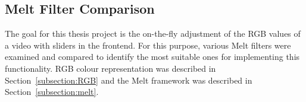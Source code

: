 \documentclass[../MasterThesis.tex]{subfiles}
\begin{document}
%
%
%
%
%
%
%
%
%
%
%
%
%
%
%





\subsection{Melt Filter Comparison} \label{subsection:meltfilter}



The goal for this thesis project is the on-the-fly adjustment of the RGB values of a video with sliders in the frontend. 
For this purpose, various Melt filters were examined and compared to identify the most suitable ones for implementing this functionality. 
RGB colour representation was described in Section~\ref{subsection:RGB} and the Melt framework was described in Section~\ref{subsection:melt}.
\end{document}
